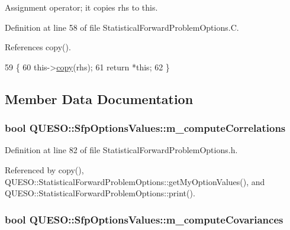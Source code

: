 Assignment operator; it copies {\ttfamily rhs} to {\ttfamily this}. 



Definition at line 58 of file Statistical\-Forward\-Problem\-Options.\-C.



References copy().


\begin{DoxyCode}
59 \{
60   this->\hyperlink{class_q_u_e_s_o_1_1_sfp_options_values_ad3e0b2e03abf1e2ca7b767fef7512af7}{copy}(rhs);
61   \textcolor{keywordflow}{return} *\textcolor{keyword}{this};
62 \}
\end{DoxyCode}


\subsection{Member Data Documentation}
\hypertarget{class_q_u_e_s_o_1_1_sfp_options_values_a4de46169004d9ccbe66fdf32ae93ea45}{
\subsubsection[{m\-\_\-compute\-Correlations}]{\setlength{\rightskip}{0pt plus 5cm}bool Q\-U\-E\-S\-O\-::\-Sfp\-Options\-Values\-::m\-\_\-compute\-Correlations}}\label{class_q_u_e_s_o_1_1_sfp_options_values_a4de46169004d9ccbe66fdf32ae93ea45}


Definition at line 82 of file Statistical\-Forward\-Problem\-Options.\-h.



Referenced by copy(), Q\-U\-E\-S\-O\-::\-Statistical\-Forward\-Problem\-Options\-::get\-My\-Option\-Values(), and Q\-U\-E\-S\-O\-::\-Statistical\-Forward\-Problem\-Options\-::print().

\hypertarget{class_q_u_e_s_o_1_1_sfp_options_values_abe755434941b852aaf5bd512c153354b}{
\subsubsection[{m\-\_\-compute\-Covariances}]{\setlength{\rightskip}{0pt plus 5cm}bool Q\-U\-E\-S\-O\-::\-Sfp\-Options\-Values\-::m\-\_\-compute\-Covariances}}\label{class_q_u_e_s_o_1_1_sfp_options_values_abe755434941b852aaf5bd512c153354b}


